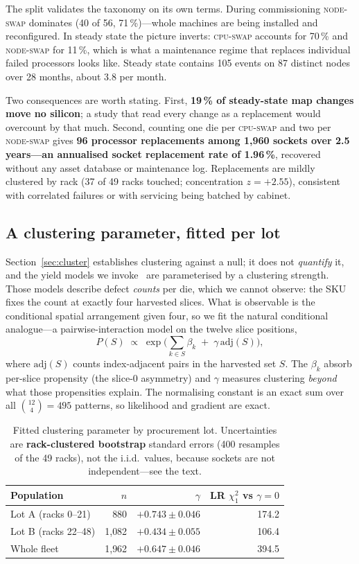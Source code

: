 \documentclass[10pt,conference]{IEEEtran}
\begin{document}
The split validates the taxonomy on its own terms. During commissioning \textsc{node-swap}
dominates (40 of 56, 71\,\%)---whole machines are being installed and reconfigured. In steady state
the picture inverts: \textsc{cpu-swap} accounts for 70\,\% and \textsc{node-swap} for 11\,\%,
which is what a maintenance regime that replaces individual failed processors looks like. Steady
state contains 105 events on 87 distinct nodes over 28 months, about 3.8 per month.

Two consequences are worth stating. First, \textbf{19\,\% of steady-state map changes move no
silicon}; a study that read every change as a replacement would overcount by that much. Second,
counting one die per \textsc{cpu-swap} and two per \textsc{node-swap} gives \textbf{96 processor
replacements among 1{,}960 sockets over 2.5 years---an annualised socket replacement rate of
1.96\,\%}, recovered without any asset database or maintenance log. Replacements are mildly
clustered by rack (37 of 49 racks touched; concentration $z=+2.55$), consistent with correlated
failures or with servicing being batched by cabinet.

\subsection{A clustering parameter, fitted per lot}
\label{sec:yield}
Section~\ref{sec:cluster} establishes clustering against a null; it does not \emph{quantify} it,
and the yield models we invoke~\cite{koren1993negbinom,bae2007waferyield} are parameterised by a
clustering strength. Those models describe defect \emph{counts} per die, which we cannot observe:
the SKU fixes the count at exactly four harvested slices. What is observable is the conditional
spatial arrangement given four, so we fit the natural conditional analogue---a pairwise-interaction
model on the twelve slice positions,
\[
  P(S)\;\propto\;\exp\Big(\textstyle\sum_{k\in S}\beta_k \;+\; \gamma\,\mathrm{adj}(S)\Big),
\]
where $\mathrm{adj}(S)$ counts index-adjacent pairs in the harvested set $S$. The $\beta_k$ absorb
per-slice propensity (the slice-0 asymmetry) and $\gamma$ measures clustering \emph{beyond} what
those propensities explain. The normalising constant is an exact sum over all
$\binom{12}{4}=495$ patterns, so likelihood and gradient are exact.

\begin{table}[h]\centering\caption{Fitted clustering parameter by procurement lot. Uncertainties
are \textbf{rack-clustered bootstrap} standard errors (400 resamples of the 49 racks), not the
i.i.d.\ values, because sockets are not independent---see the text.}
\label{tab:yield}
\begin{tabular}{lrrr}\toprule
Population & $n$ & $\gamma$ & LR $\chi^2_1$ vs $\gamma{=}0$\\\midrule
Lot A (racks 0--21)  & 880 & $+0.743\pm0.046$ & 174.2\\
Lot B (racks 22--48) & 1{,}082 & $+0.434\pm0.055$ & 106.4\\
Whole fleet          & 1{,}962 & $+0.647\pm0.046$ & 394.5\\
\bottomrule\end{tabular}\end{table}
\end{document}
